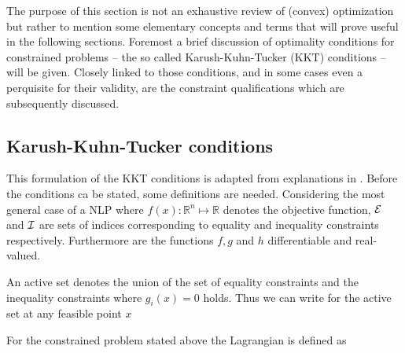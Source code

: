 The purpose of this section is not an exhaustive review of (convex) optimization but rather to mention
some elementary concepts and terms that will prove useful in the following sections. Foremost a brief
discussion of optimality conditions for constrained problems -- the so called Karush-Kuhn-Tucker (KKT)
conditions -- will be given. Closely linked to those conditions, and in some cases even a perquisite for their
validity, are the constraint qualifications which are subsequently discussed.

    \subsection{Karush-Kuhn-Tucker conditions}
    \label{sec:opt:theory:kkt}
    This formulation of the KKT conditions is adapted from explanations in \cite{Nocedal.2006}.
    Before the conditions ca be stated, some definitions are needed. Considering the most general case of a NLP
    where $f(x): \mathbb{R}^n \mapsto \mathbb{R}$ denotes the objective function, $\mathcal{E}$ and $\mathcal{I}$
    are sets of indices corresponding to equality and inequality constraints respectively. Furthermore are
    the functions $f, g$ and $h$ differentiable and real-valued.

    An active set denotes the union of the set of equality constraints and the inequality constraints
    where $g_i(x) = 0$ holds. Thus we can write for the active set at any feasible point $x$

    For the constrained problem stated above the Lagrangian is defined as

